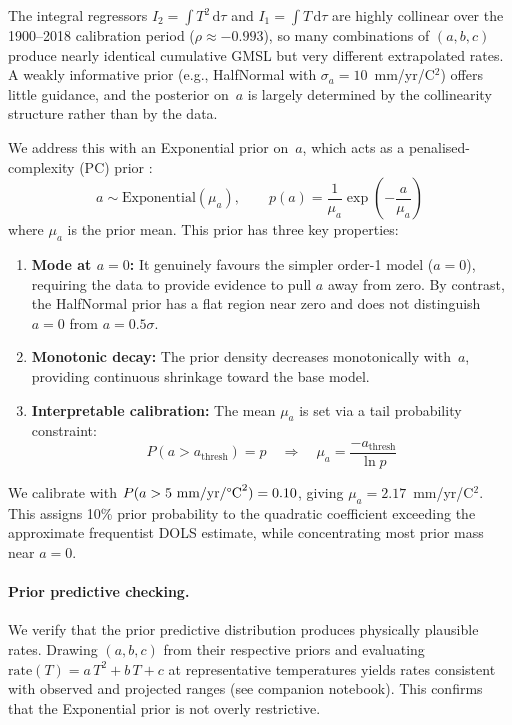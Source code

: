 \documentclass[11pt]{article}
\begin{document}
The integral regressors $I_2 = \int T^2\,\mathrm{d}\tau$ and $I_1 = \int T\,\mathrm{d}\tau$ are highly collinear over the 1900--2018 calibration period ($\rho \approx -0.993$), so many combinations of $(a, b, c)$ produce nearly identical cumulative GMSL but very different extrapolated rates.  A weakly informative prior (e.g., HalfNormal with $\sigma_a = 10$~mm/yr/\textdegree C$^2$) offers little guidance, and the posterior on~$a$ is largely determined by the collinearity structure rather than by the data.

We address this with an Exponential prior on~$a$, which acts as a penalised-complexity (PC) prior \citep{simpson2017penalising}:
\begin{equation}
  a \sim \text{Exponential}(\mu_a), \qquad
  p(a) = \frac{1}{\mu_a} \exp\!\left(-\frac{a}{\mu_a}\right)
  \label{eq:pc-prior}
\end{equation}
where $\mu_a$ is the prior mean.  This prior has three key properties:
\begin{enumerate}
  \item \textbf{Mode at $a = 0$:} It genuinely favours the simpler order-1 model ($a = 0$), requiring the data to provide evidence to pull $a$ away from zero.  By contrast, the HalfNormal prior has a flat region near zero and does not distinguish $a = 0$ from $a = 0.5\sigma$.
  \item \textbf{Monotonic decay:} The prior density decreases monotonically with~$a$, providing continuous shrinkage toward the base model.
  \item \textbf{Interpretable calibration:} The mean $\mu_a$ is set via a tail probability constraint:
  \begin{equation}
    P(a > a_{\text{thresh}}) = p
    \quad\Longrightarrow\quad
    \mu_a = \frac{-a_{\text{thresh}}}{\ln p}
    \label{eq:pc-calibration}
  \end{equation}
\end{enumerate}

We calibrate with $P(a > 5\text{ mm/yr/\textdegree C}^2) = 0.10$, giving $\mu_a = 2.17$~mm/yr/\textdegree C$^2$.  This assigns 10\% prior probability to the quadratic coefficient exceeding the approximate frequentist DOLS estimate, while concentrating most prior mass near $a = 0$.

\paragraph{Prior predictive checking.}  We verify that the prior predictive distribution produces physically plausible rates.  Drawing $(a, b, c)$ from their respective priors and evaluating $\text{rate}(T) = a\,T^2 + b\,T + c$ at representative temperatures yields rates consistent with observed and projected ranges (see companion notebook).  This confirms that the Exponential prior is not overly restrictive.
\end{document}
